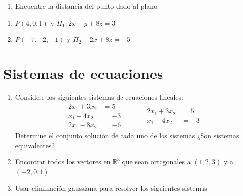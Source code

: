 \documentclass[
]{article}
\providecommand{\tightlist}{%
  \setlength{\itemsep}{0pt}\setlength{\parskip}{0pt}}
\begin{document}
\begin{enumerate}
\def\labelenumi{\arabic{enumi}.}
\setcounter{enumi}{11}
\tightlist
\item
  Encuentre la distancia del punto dado al plano
\end{enumerate}

\begin{enumerate}
\def\labelenumi{\alph{enumi})}
\item
  \(P(4,0,1)\) y \(\Pi_1: 2x-y+8z=3\)
\item
  \(P(-7,-2,-1)\) y \(\Pi_2: -2x+8z=-5\)
\end{enumerate}

\newpage

\hypertarget{sistemas-de-ecuaciones}{%
\section{Sistemas de ecuaciones}\label{sistemas-de-ecuaciones}}

\begin{enumerate}
\def\labelenumi{\arabic{enumi}.}
\item
  Considere los siguientes sistemas de ecuaciones lineales: \[
  \begin{array}{cc}
    2x_1 + 3x_2 &= 5 \\
    x_1  - 4x_2 &= -3 \\
    2x_1 - 8x_2 & = -6
  \end{array} 
  \quad \quad \quad
  \begin{array}{cc}
    2x_1 + 3x_2 &= 5 \\
    x_1  - 4x_2 &= -3 
  \end{array}
  \] Determine el conjunto solución de cada uno de los sistemas ¿Son
  sistemas equivalentes?
\item
  Encontrar todos los vectores en \(\mathbb{R}^3\) que sean ortogonales
  a \((1,2,3)\) y a \((-2,0,1)\).
\item
  Usar eliminación gaussiana para resolver los siguientes sistemas
\end{enumerate}
\end{document}
